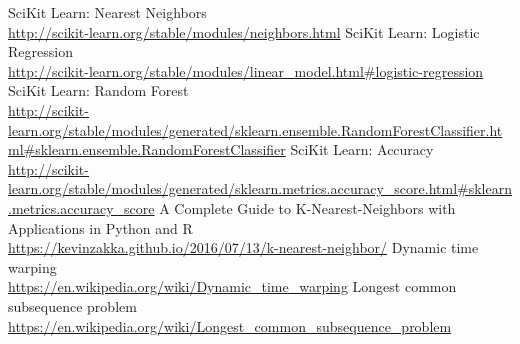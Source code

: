 \documentclass[12pt]{article}
\begin{document}
	\newpage
	\begin{thebibliography}{30}
		SciKit Learn: Nearest Neighbors \\
		 \url{http://scikit-learn.org/stable/modules/neighbors.html}
		  SciKit Learn: Logistic Regression \\
		 \url{http://scikit-learn.org/stable/modules/linear_model.html#logistic-regression}
		  SciKit Learn: Random Forest \\
		 \url{http://scikit-learn.org/stable/modules/generated/sklearn.ensemble.RandomForestClassifier.html#sklearn.ensemble.RandomForestClassifier}
		  SciKit Learn: Accuracy \\
		 \url{http://scikit-learn.org/stable/modules/generated/sklearn.metrics.accuracy_score.html#sklearn.metrics.accuracy_score}
		 A Complete Guide to K-Nearest-Neighbors with Applications in Python and R \\
		 \url{https://kevinzakka.github.io/2016/07/13/k-nearest-neighbor/}
		  Dynamic time warping \\
		 \url{https://en.wikipedia.org/wiki/Dynamic_time_warping}
		  Longest common subsequence problem \\
		 \url{https://en.wikipedia.org/wiki/Longest_common_subsequence_problem}
    \end{thebibliography}
	
\end{document}
